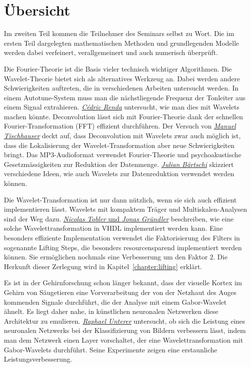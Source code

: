 %
%
%
\chapter*{Übersicht}
\rhead{}
\label{buch:uebersicht}
Im zweiten Teil kommen die Teilnehmer des Seminars selbst zu Wort.
Die im ersten Teil dargelegten mathematischen Methoden und
grundlegenden Modelle werden dabei verfeinert, verallgemeinert
und auch numerisch überprüft.

Die Fourier-Theorie ist die Basis vieler technisch wichtiger Algorithmen.
Die Wavelet-Theorie bietet sich als alternatives Werkzeug an.
Dabei werden andere Schwierigkeiten auftreten, die in verschiedenen
Arbeiten untersucht werden.
In einem Autotune-System muss man die nächstliegende Frequenz der
Tonleiter aus einem Signal extrahieren.
\hyperref[chapter:autotune]{\em Cédric Renda} untersucht,
wie man dies mit Wavelets machen könnte.
Deconvolution lässt sich mit Fourier-Theorie dank der schnellen
Fourier-Transformation (FFT) effizient durchführen.
Der Versuch von \hyperref[chapter:deconvolve]{\em Manuel Tischhauser}
deckt auf, dass Deconvolution
mit Wavelets zwar auch möglich ist, dass die Lokalisierung der
Wavelet-Transformation aber neue Schwierigkeiten bringt.
Das MP3-Audioformat verwendet Fourier-Theorie und psychoakustische
Gesetzmässigkeiten zur Reduktion der Datenmenge.
\hyperref[chapter:compress]{\em Julian Bärtschi} skizziert verschiedene
Ideen, wie auch Wavelets zur Datenreduktion verwendet werden können.

Die Wavelet-Transformation ist nur dann nützlich, wenn sie sich auch
effizient implementieren lässt.
Wavelets mit kompaktem Träger und Multiskalen-Analysen sind der Weg dazu.
\hyperref[chapter:fpga]{{\em Nicolas Tobler} und {\em Jonas Gründler}}
beschreiben, wie eine
solche Wavelettransformation in VHDL implementiert werden kann.
Eine besonders effiziente Implementation verwendet die Faktorisierung
des Filters in sogenannte Lifting Steps, die besonders resourcensparend
implementiert werden können.
Sie ermöglichen nochmals eine Verbesserung um den Faktor $2$.
Die Herkunft dieser Zerlegung wird in Kapitel~\ref{chapter:lifting}
erklärt.

Es ist in der Gehirnforschung schon länger bekannt, dass der visuelle Kortex
im Gehirn von Säugetieren eine Vorverarbeitung der von der Netzhaut des
Auges kommenden Signale durchführt, die der Analyse mit einem Gabor-Wavelet
ähnelt.
Es liegt daher nahe, in künstlichen neuronalen Netzwerken diese Architektur
zu emulieren.
\hyperref[chapter:visuell]{\em Raphael Unterer} untersucht, ob sich die
Leistung eines neuronalen Netzwerks bei der Klassifizierung von Bildern
verbessern lässt, indem man dem Netzwerk einen Layer vorschaltet, der
eine Wavelettransformation mit Gabor-Wavelets durchführt.
Seine Experimente zeigen eine erstaunliche Leistungsverbesserung.

